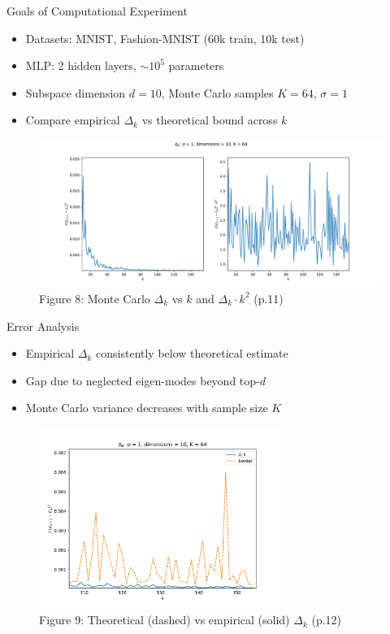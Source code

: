 \documentclass{beamer}
\begin{document}
\begin{frame}{Goals of Computational Experiment}
    \begin{itemize}
        \item Datasets: MNIST, Fashion-MNIST (60k train, 10k test)
        \item MLP: 2 hidden layers, $\sim 10^5$ parameters
        \item Subspace dimension $d=10$, Monte Carlo samples $K=64$, $\sigma=1$
        \item Compare empirical $\Delta_k$ vs theoretical bound across $k$
    \end{itemize}

    \begin{figure}
        \centering
        \includegraphics[width=1.05\textwidth,trim=0 17 0 1.5cm,clip]{img/delta_eigen_1_10_64.pdf}
        \caption*{\tiny Figure 8: Monte Carlo $\Delta_k$ vs $k$ and $\Delta_k\cdot k^2$ (p.11)}
    \end{figure}
\end{frame}

\begin{frame}{Error Analysis}
    \begin{itemize}
        \item Empirical $\Delta_k$ consistently below theoretical estimate
        \item Gap due to neglected eigen-modes beyond top-$d$
        \item Monte Carlo variance decreases with sample size $K$
    \end{itemize}

    \begin{figure}
        \centering
        \includegraphics[width=0.7\textwidth]{img/delta_border_1_10_64.pdf}
        \caption*{\tiny Figure 9: Theoretical (dashed) vs empirical (solid) $\Delta_k$ (p.12)}
    \end{figure}
\end{frame}
\end{document}
